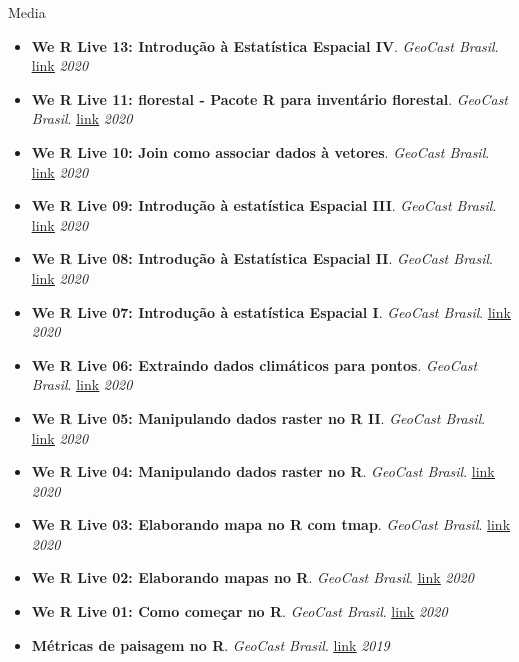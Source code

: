 \documentclass{resume}
\begin{document}
\begin{rSection}{Media}
\begin{itemize}
\item {\bf We R Live 13: Introdução à Estatística Espacial IV}. {\it GeoCast Brasil}. \href{https://youtu.be/IsOJvaWdyXE}{\underline{link}} \hfill{\em 2020}
\item {\bf We R Live 11: florestal - Pacote R para inventário florestal}. {\it GeoCast Brasil}. \href{https://youtu.be/xOgsVywKADI}{\underline{link}} \hfill{\em 2020}
\item {\bf We R Live 10: Join como associar dados à vetores}. {\it GeoCast Brasil}. \href{https://youtu.be/BvURukaIDM0}{\underline{link}} \hfill{\em 2020}
\item {\bf We R Live 09: Introdução à estatística Espacial III}. {\it GeoCast Brasil}. \href{https://youtu.be/eaR7pTsQFDQ}{\underline{link}} \hfill{\em 2020}
\item {\bf We R Live 08: Introdução à Estatística Espacial II}. {\it GeoCast Brasil}. \href{https://youtu.be/BCl_V-SpQec}{\underline{link}} \hfill{\em 2020}
\item {\bf We R Live 07: Introdução à estatística Espacial I}. {\it GeoCast Brasil}. \href{https://youtu.be/fHWD4qyKj84}{\underline{link}} \hfill{\em 2020}
\item {\bf We R Live 06: Extraindo dados climáticos para pontos}. {\it GeoCast Brasil}. \href{https://youtu.be/-_ODMFDU6ck}{\underline{link}} \hfill{\em 2020}
\item {\bf We R Live 05: Manipulando dados raster no R II}. {\it GeoCast Brasil}. \href{https://youtu.be/AKJo_Q0dsMI}{\underline{link}} \hfill{\em 2020}
\item {\bf We R Live 04: Manipulando dados raster no R}. {\it GeoCast Brasil}. \href{https://youtu.be/dFC9SuGLuX8}{\underline{link}} \hfill{\em 2020}
\item {\bf We R Live 03: Elaborando mapa no R com tmap}. {\it GeoCast Brasil}. \href{https://youtu.be/BmlM25XQ3QA}{\underline{link}} \hfill{\em 2020}
\item {\bf We R Live 02: Elaborando mapas no R}. {\it GeoCast Brasil}. \href{https://youtu.be/eHht0n3Ppcg}{\underline{link}} \hfill{\em 2020}
\item {\bf We R Live 01: Como começar no R}. {\it GeoCast Brasil}. \href{https://youtu.be/ZORFVdwtJ1U}{\underline{link}} \hfill{\em 2020}
\item {\bf Métricas de paisagem no R}. {\it GeoCast Brasil}. \href{https://youtu.be/RCTrLx_33D8}{\underline{link}} \hfill{\em 2019}
\end{itemize} 


\end{rSection}
\end{document}
